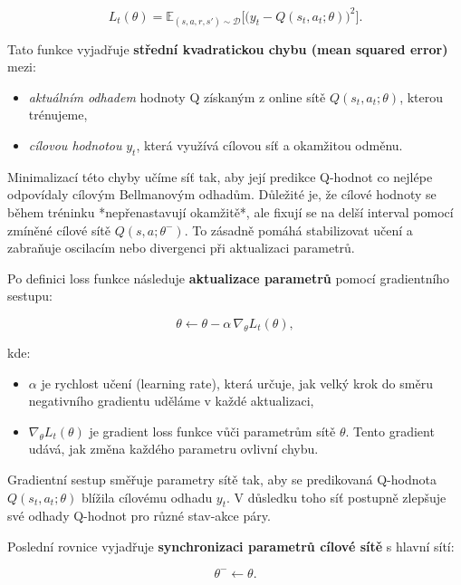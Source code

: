 \begin{equation}
L_t(\theta)=\mathbb{E}_{(s,a,r,s')\sim\mathcal{D}}\Big[\big(y_t-Q(s_t,a_t;\theta)\big)^2\Big].
\end{equation}

Tato funkce vyjadřuje \textbf{střední kvadratickou chybu (mean squared error)} mezi:
\begin{itemize}
    \item \textit{aktuálním odhadem} hodnoty Q získaným z online sítě \(Q(s_t,a_t;\theta)\), kterou trénujeme,
    \item \textit{cílovou hodnotou} \(y_t\), která využívá cílovou síť a okamžitou odměnu.
\end{itemize}

Minimalizací této chyby učíme síť tak, aby její predikce Q-hodnot co nejlépe odpovídaly cílovým Bellmanovým odhadům. Důležité je, že cílové hodnoty se během tréninku *nepřenastavují okamžitě*, ale fixují se na delší interval pomocí zmíněné cílové sítě \(Q(s,a;\theta^-)\). To zásadně pomáhá stabilizovat učení a zabraňuje oscilacím nebo divergenci při aktualizaci parametrů.

Po definici loss funkce následuje \textbf{aktualizace parametrů} pomocí gradientního sestupu:

\begin{equation}
\theta\leftarrow\theta-\alpha\,\nabla_{\theta}L_t(\theta),
\end{equation}

kde:
\begin{itemize}
    \item \(\alpha\) je rychlost učení (learning rate), která určuje, jak velký krok do směru negativního gradientu uděláme v každé aktualizaci,
    \item \(\nabla_{\theta}L_t(\theta)\) je gradient loss funkce vůči parametrům sítě \(\theta\). Tento gradient udává, jak změna každého parametru ovlivní chybu.
\end{itemize}

Gradientní sestup směřuje parametry sítě tak, aby se predikovaná Q-hodnota \(Q(s_t,a_t;\theta)\) blížila cílovému odhadu \(y_t\). V důsledku toho síť postupně zlepšuje své odhady Q-hodnot pro různé stav-akce páry.

Poslední rovnice vyjadřuje \textbf{synchronizaci parametrů cílové sítě} s hlavní sítí:

\begin{equation}
\theta^-\leftarrow\theta.
\end{equation}

